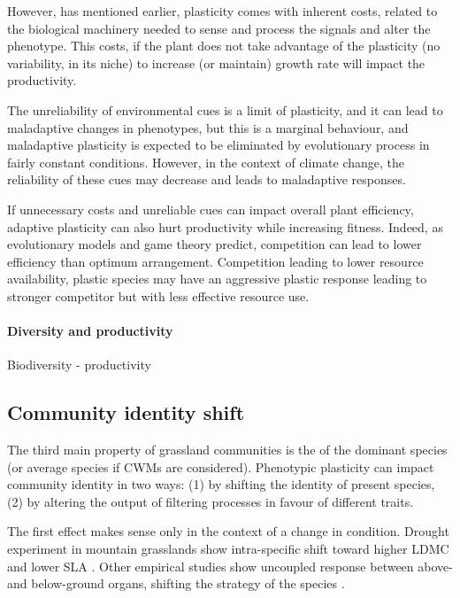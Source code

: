 However, has mentioned earlier, plasticity comes with inherent costs, related to the biological machinery needed to sense and process the signals and alter the phenotype. This costs, if the plant does not take advantage of the plasticity (no variability, in its niche) to increase (or maintain) growth rate will impact the productivity.

The unreliability of environmental cues is a limit of plasticity, and it can lead to maladaptive changes in phenotypes, but this is a marginal behaviour, and maladaptive plasticity is expected to be eliminated by evolutionary process in fairly constant conditions. However, in the context of climate change, the reliability of these cues may decrease and leads to maladaptive responses. 

If unnecessary costs and unreliable cues can impact overall plant efficiency, adaptive plasticity can also hurt productivity while increasing fitness. Indeed, as evolutionary models and game theory predict, competition can lead to lower efficiency than optimum arrangement. Competition leading to lower resource availability, plastic species may have an aggressive plastic response leading to stronger competitor but with less effective resource use.


\paragraph{Diversity and productivity}

Biodiversity - productivity
%
%


\subsection{Community identity shift}

The third main property of grassland communities is the  of the dominant species (or average species if CWMs are considered). Phenotypic plasticity can impact community identity in two ways: (1) by shifting the identity of present species, (2) by altering the output of filtering processes in favour of different traits.

The first effect makes sense only in the context of a change in condition. Drought experiment in mountain grasslands show intra-specific shift toward higher LDMC and lower SLA \parencite{jung_intraspecific_2014}. Other empirical studies show uncoupled response between above- and below-ground organs, shifting the strategy of the species \parencite{freschett_plasticity_2014}.


